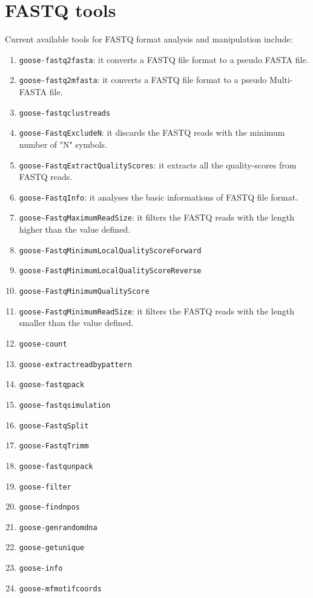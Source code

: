 \chapter{FASTQ tools}
\label{fastq}

Current available tools for FASTQ format analysis and manipulation include:
\begin{enumerate}

\item \texttt{goose-fastq2fasta}: it converts a FASTQ file format to a pseudo FASTA file.
\item \texttt{goose-fastq2mfasta}: it converts a FASTQ file format to a pseudo Multi-FASTA file.
\item \texttt{goose-fastqclustreads}
\item \texttt{goose-FastqExcludeN}: it discards the FASTQ reads with the minimum number of "N" symbols.
\item \texttt{goose-FastqExtractQualityScores}: it extracts all the quality-scores from FASTQ reads.
\item \texttt{goose-FastqInfo}: it analyses the basic informations of FASTQ file format.
\item \texttt{goose-FastqMaximumReadSize}: it filters the FASTQ reads with the length higher than the value defined.
\item \texttt{goose-FastqMinimumLocalQualityScoreForward}
\item \texttt{goose-FastqMinimumLocalQualityScoreReverse}
\item \texttt{goose-FastqMinimumQualityScore}
\item \texttt{goose-FastqMinimumReadSize}: it filters the FASTQ reads with the length smaller than the value defined.

\item \texttt{goose-count}
\item \texttt{goose-extractreadbypattern}

\item \texttt{goose-fastqpack}
\item \texttt{goose-fastqsimulation}
\item \texttt{goose-FastqSplit}
\item \texttt{goose-FastqTrimm}
\item \texttt{goose-fastqunpack}
\item \texttt{goose-filter}
\item \texttt{goose-findnpos}

\item \texttt{goose-genrandomdna}
\item \texttt{goose-getunique}
\item \texttt{goose-info}
\item \texttt{goose-mfmotifcoords}


\end{enumerate}
